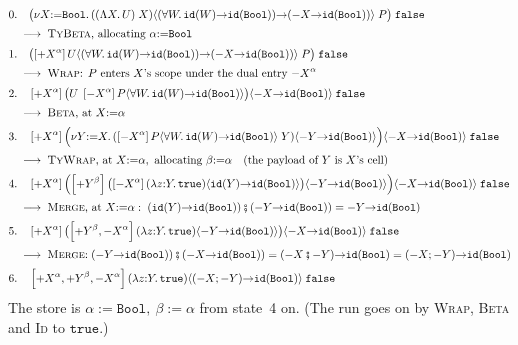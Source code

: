\documentclass[11pt]{article}
\newcommand{\key}[1]{\mathtt{#1}}
\newcommand{\id}[1]{\key{id}(#1)}
\newcommand{\seal}[1]{-#1}
\newcommand{\becomes}{\longrightarrow}
\newcommand{\of}{{:}}
\newcommand{\tu}{{\to}}
\newcommand{\dotspace}{.\,}
\newcommand{\lam}[1]{\lambda #1 \dotspace}
\newcommand{\Lam}[1]{\Lambda #1 \dotspace}
\newcommand{\all}[1]{\forall #1 \dotspace}
\newcommand{\app}{\;}
\newcommand{\Bool}{\key{Bool}}
\newcommand{\True}{\key{true}}
\newcommand{\False}{\key{false}}
\newcommand{\by}{{:=}}
\newcommand{\nuinst}[4]{\nu #1\by #2 \dotspace (#3 \app #1) \langle #4 \rangle}
\newcommand{\boundry}[3]{\left[#2\right] #1 \langle #3 \rangle}
\newcommand{\cmp}{\mathbin{\fatsemi}}
\newcommand{\bnd}[1]{{+#1}}
\newcommand{\ubnd}[1]{{-#1}}
\newcommand{\rul}[1]{\textsc{#1}}
\begin{document}
\begin{align*}
&\text{0.}\quad
  \bigl(\nuinst{X}{\Bool}{(\Lam{X} U)}
     {(\all{W} \id{W} \tu \id{\Bool}) \tu (\seal{X} \tu \id{\Bool})}
   \app P\bigr) \app \False
\\[2pt]
&\quad\becomes\; \text{\rul{TyBeta}, allocating } \alpha \by \Bool
\\[2pt]
&\text{1.}\quad
  \bigl(\boundry{U}{\bnd{X}^\alpha}
     {(\all{W} \id{W} \tu \id{\Bool}) \tu (\seal{X} \tu \id{\Bool})}
   \app P\bigr) \app \False
\\[2pt]
&\quad\becomes\; \text{\rul{Wrap}: } P \text{ enters } X\text{'s scope
  under the dual entry } \ubnd{X}^\alpha
\\[2pt]
&\text{2.}\quad
  \boundry{\bigl(U \app
     \boundry{P}{\ubnd{X}^\alpha}{\all{W} \id{W} \tu \id{\Bool}}\bigr)}
   {\bnd{X}^\alpha}{\seal{X} \tu \id{\Bool}} \app \False
\\[2pt]
&\quad\becomes\; \text{\rul{Beta}, at } X \by \alpha
\\[2pt]
&\text{3.}\quad
  \boundry{\Bigl(\nuinst{Y}{X}
     {\boundry{P}{\ubnd{X}^\alpha}{\all{W} \id{W} \tu \id{\Bool}}}
     {\seal{Y} \tu \id{\Bool}}\Bigr)}
   {\bnd{X}^\alpha}{\seal{X} \tu \id{\Bool}} \app \False
\\[2pt]
&\quad\becomes\; \text{\rul{TyWrap}, at } X \by \alpha,
  \text{ allocating } \beta \by \alpha
  \quad (\text{the payload of } Y \text{ is } X\text{'s cell})
\\[2pt]
&\text{4.}\quad
  \boundry{\Bigl(\boundry
     {\bigl(\boundry{(\lam{z \of Y} \True)}{\ubnd{X}^\alpha}
        {\id{Y} \tu \id{\Bool}}\bigr)}
     {\bnd{Y}^\beta}{\seal{Y} \tu \id{\Bool}}\Bigr)}
   {\bnd{X}^\alpha}{\seal{X} \tu \id{\Bool}} \app \False
\\[2pt]
&\quad\becomes\; \text{\rul{Merge}, at } X \by \alpha:\;
  (\id{Y} \tu \id{\Bool}) \cmp (\seal{Y} \tu \id{\Bool})
  = \seal{Y} \tu \id{\Bool}
\\[2pt]
&\text{5.}\quad
  \boundry{\bigl(\boundry{(\lam{z \of Y} \True)}
     {\bnd{Y}^\beta, \ubnd{X}^\alpha}{\seal{Y} \tu \id{\Bool}}\bigr)}
   {\bnd{X}^\alpha}{\seal{X} \tu \id{\Bool}} \app \False
\\[2pt]
&\quad\becomes\; \text{\rul{Merge}:}\;
  (\seal{Y} \tu \id{\Bool}) \cmp (\seal{X} \tu \id{\Bool})
  = (\seal{X} \cmp \seal{Y}) \tu \id{\Bool}
  = (\seal{X} ; \seal{Y}) \tu \id{\Bool}
\\[2pt]
&\text{6.}\quad
  \boundry{(\lam{z \of Y} \True)}
     {\bnd{X}^\alpha, \bnd{Y}^\beta, \ubnd{X}^\alpha}
     {(\seal{X} ; \seal{Y}) \tu \id{\Bool}}
   \app \False
\end{align*}
The store is $\alpha \by \Bool,\ \beta \by \alpha$ from state~4 on.
(The run goes on by \rul{Wrap}, \rul{Beta} and \rul{Id} to $\True$.)
\end{document}
